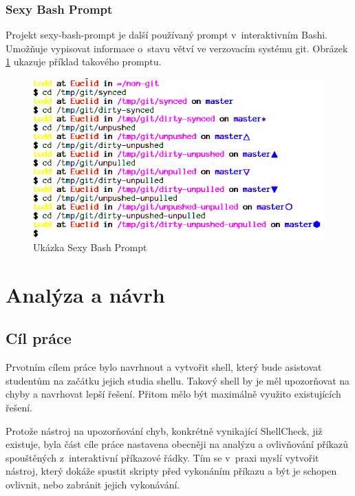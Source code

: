 \documentclass[thesis=M,czech]{FITthesis}[2012/06/26]
\begin{document}

\subsection{Sexy Bash Prompt}

Projekt sexy-bash-prompt \cite{sexybashprompt} je další používaný prompt v~interaktivním Bashi. Umožňuje vypisovat informace o~stavu větví ve verzovacím systému git. Obrázek \ref{fig:sexy_prompt} ukazuje příklad takového promptu.

\begin{figure}[htb]\centering
	\includegraphics[width=\textwidth]{./images/sexy_prompt_edited}
	\caption{Ukázka Sexy Bash Prompt}
	\label{fig:sexy_prompt}
\end{figure}




%
%
%
\chapter{Analýza a návrh}

%
%
%
\section{Cíl práce}

Prvotním cílem práce bylo navrhnout a vytvořit shell, který bude asistovat studentům na začátku jejich studia shellu. Takový shell by je měl upozorňovat na chyby a navrhovat lepší řešení. Přitom mělo být maximálně využito existujících řešení.

Protože nástroj na upozorňování chyb, konkrétně vynikající ShellCheck, již existuje, byla část cíle práce nastavena obecněji na analýzu a ovlivňování příkazů spouštěných z~interaktivní příkazové řádky. Tím se v~praxi myslí vytvořit nástroj, který dokáže spustit skripty před vykonáním příkazu a být je schopen ovlivnit, nebo zabránit jejich vykonávání.
\end{document}
